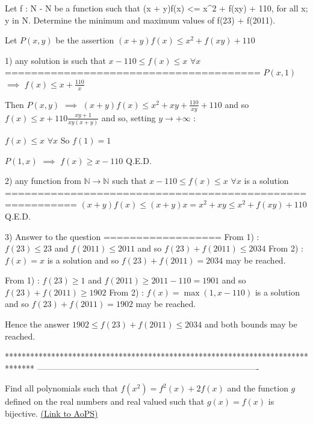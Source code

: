 \begin{solution}
	\begin{tcolorbox}Let f : N - N be a function such that (x + y)f(x) <= x^2 + f(xy) + 110, for all x; y in N.
Determine the minimum and maximum values of f(23) + f(2011).\end{tcolorbox}
Let $P(x,y)$ be the assertion $(x+y)f(x)\le x^2+f(xy)+110$

1) any solution is such that $x-110\le f(x)\le x$ $\forall x$
=======================================
$P(x,1)$ $\implies$ $f(x)\le x+\frac{110}x$

Then $P(x,y)$ $\implies$ $(x+y)f(x)\le x^2+xy+\frac{110}{xy}+110$ and so $f(x)\le x+110\frac{xy+1}{xy(x+y)}$ and so, setting $y\to +\infty$ :

$f(x)\le x$ $\forall x$
So $f(1)=1$

$P(1,x)$ $\implies$ $f(x)\ge x-110$
Q.E.D.

2) any function from $\mathbb N\to\mathbb N$ such that $x-110\le f(x)\le x$ $\forall x$ is a solution
=========================================================
$(x+y)f(x)\le (x+y)x=x^2+xy\le x^2+f(xy)+110$
Q.E.D.

3) Answer to the question
==================
From 1) : $f(23)\le 23$ and $f(2011)\le 2011$ and so $f(23)+f(2011)\le 2034$ 
From 2) : $f(x)=x$ is a solution and so $f(23)+f(2011)= 2034$ may be reached.

From 1) : $f(23)\ge 1$ and $f(2011)\ge 2011-110= 1901$ and so $f(23)+f(2011)\ge 1902$
From 2) : $f(x)=\max(1,x-110)$ is a solution and so $f(23)+f(2011)= 1902$ may be reached.

Hence the answer $\boxed{1902\le f(23)+f(2011)\le 2034}$ and both bounds may be reached.
\end{solution}
*******************************************************************************
-------------------------------------------------------------------------------

\begin{problem}
	Find all polynomials such that $ f(x^{2})=f^{2}(x)+2f(x) $ and the function $ g $ defined on the real numbers and real valued such that $ g(x)=f(x) $ is bijective.
	\flushright \href{https://artofproblemsolving.com/community/c6h469554}{(Link to AoPS)}
\end{problem}



